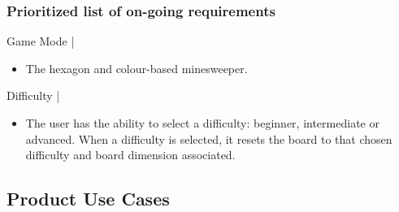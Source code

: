 \documentclass[12pt, a4]{report}
\begin{document}
			\subsubsection{Prioritized list of on-going requirements}
			Game Mode |
			\begin{itemize}
				\item The hexagon and colour-based minesweeper.
			\end{itemize}
				Difficulty |
		\begin{itemize}
			\par 
			\item The user has the ability to select a difficulty: beginner, intermediate or advanced. When a difficulty is 	selected, it resets the board to that chosen difficulty and board dimension associated. 
		\end{itemize}	
		
	
	\subsection{Product Use Cases}
\end{document}
